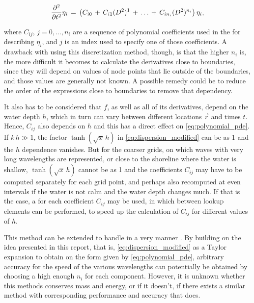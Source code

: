 \begin{equation} \label{eq:polynomial_pde}
\renewcommand*{\arraystretch}{2}
\begin{array}{c}
\displaystyle \frac{\partial^2}{\partial t^2}\eta_i \,=\, \left(C_{i0} \,+\, C_{i1}(D^2)^1 \,+\, \dots \,+\, C_{in_i}(D^2)^{n_i}\right)\eta_i,
\end{array}
\end{equation}

where $C_{ij},\,j=0,\dots,n_i$ are a sequence of polynomial coefficients used in the \PDE for describing $\eta_i$, and $j$ is an index used to specify one of those coefficients. A drawback with using this discretization method, though, is that the higher $n_i$ is, the more difficult it becomes to calculate the derivatives close to boundaries, since they will depend on values of node points that lie outside of the boundaries, and those values are generally not known. A possible remedy could be to reduce the order of the expressions close to boundaries to remove that dependency.

It also has to be considered that $f$, as well as all of its derivatives, depend on the water depth $h$, which in turn can vary between different locations $\vec{r}$ and times $t$. Hence, $C_{ij}$ also depends on $h$ and this has a direct effect on \eqref{eq:polynomial_pde}. If $k\,h \gg 1$, the factor $\tanh(\sqrt{x}\,h)$ in \eqref{eq:dispersion_modified} can be \approximated as 1 and the $h$ dependence vanishes. But for the coarser grids, on which waves with very long wavelengths are represented, or close to the shoreline where the water is shallow, $\tanh(\sqrt{x}\,h)$ cannot be \approximated as 1 and the coefficients $C_{ij}$ may have to be computed separately for each grid point, and perhaps also recomputed at even intervals if the water is not calm and the water depth changes much. If that is the case, a  for each coefficient $C_{ij}$ may be used, in which \interpolation between lookup elements can be performed, to speed up the calculation of $C_{ij}$ for different values of $h$.

This method can be extended to handle \FSI in a very \approximating manner \citep{Ottosson2011}. By building on the idea presented in this report, that is, \approximating \eqref{eq:dispersion_modified} as a Taylor expansion to obtain \PDEs on the form given by \eqref{eq:polynomial_pde}, arbitrary accuracy for the speed of the various wavelengths can potentially be obtained by choosing a high enough $n_i$ for each component. However, it is unknown whether this methods conserves mass and energy, or if it doesn't, if there exists a similar method with corresponding performance and accuracy that does.

